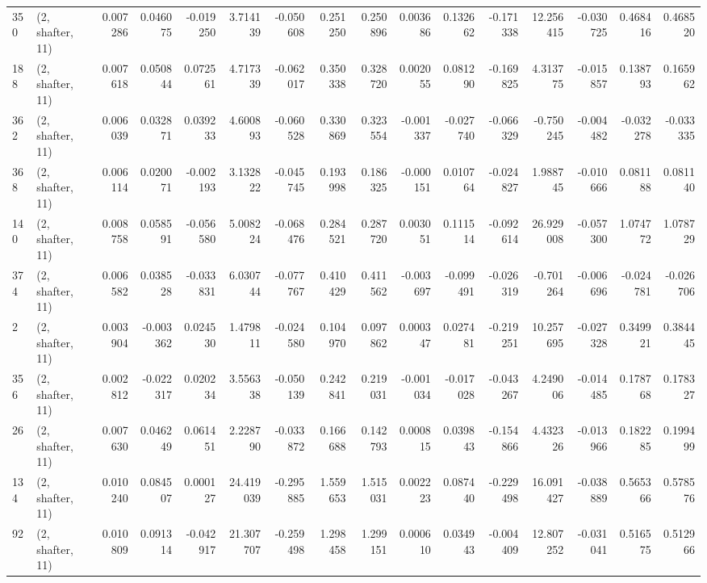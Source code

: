 \begin{tabular}{llrrrrrrrrrrrrrr}
350 &  (2, shafter, 11) &   0.007286 &  0.046075 & -0.019250 &    3.714139 & -0.050608 &   0.251250 &  0.250896 &  0.003686 &  0.132662 & -0.171338 &    12.256415 & -0.030725 &  0.468416 &  0.468520 \\
188 &  (2, shafter, 11) &   0.007618 &  0.050844 &  0.072561 &    4.717339 & -0.062017 &   0.350338 &  0.328720 &  0.002055 &  0.081290 & -0.169825 &     4.313775 & -0.015857 &  0.138793 &  0.165962 \\
362 &  (2, shafter, 11) &   0.006039 &  0.032871 &  0.039233 &    4.600893 & -0.060528 &   0.330869 &  0.323554 & -0.001337 & -0.027740 & -0.066329 &    -0.750245 & -0.004482 & -0.032278 & -0.033335 \\
368 &  (2, shafter, 11) &   0.006114 &  0.020071 & -0.002193 &    3.132822 & -0.045745 &   0.193998 &  0.186325 & -0.000151 &  0.010764 & -0.024827 &     1.988745 & -0.010666 &  0.081188 &  0.081140 \\
140 &  (2, shafter, 11) &   0.008758 &  0.058591 & -0.056580 &    5.008224 & -0.068476 &   0.284521 &  0.287720 &  0.003051 &  0.111514 & -0.092614 &    26.929008 & -0.057300 &  1.074772 &  1.078729 \\
374 &  (2, shafter, 11) &   0.006582 &  0.038528 & -0.033831 &    6.030744 & -0.077767 &   0.410429 &  0.411562 & -0.003697 & -0.099491 & -0.026319 &    -0.701264 & -0.006696 & -0.024781 & -0.026706 \\
2   &  (2, shafter, 11) &   0.003904 & -0.003362 &  0.024530 &    1.479811 & -0.024580 &   0.104970 &  0.097862 &  0.000347 &  0.027481 & -0.219251 &    10.257695 & -0.027328 &  0.349921 &  0.384445 \\
356 &  (2, shafter, 11) &   0.002812 & -0.022317 &  0.020234 &    3.556338 & -0.050139 &   0.242841 &  0.219031 & -0.001034 & -0.017028 & -0.043267 &     4.249006 & -0.014485 &  0.178768 &  0.178327 \\
26  &  (2, shafter, 11) &   0.007630 &  0.046249 &  0.061451 &    2.228790 & -0.033872 &   0.166688 &  0.142793 &  0.000815 &  0.039843 & -0.154866 &     4.432326 & -0.013966 &  0.182285 &  0.199499 \\
134 &  (2, shafter, 11) &   0.010240 &  0.084507 &  0.000127 &   24.419039 & -0.295885 &   1.559653 &  1.515031 &  0.002223 &  0.087440 & -0.229498 &    16.091427 & -0.038889 &  0.565366 &  0.578576 \\
92  &  (2, shafter, 11) &   0.010809 &  0.091314 & -0.042917 &   21.307707 & -0.259498 &   1.298458 &  1.299151 &  0.000610 &  0.034943 & -0.004409 &    12.807252 & -0.031041 &  0.516575 &  0.512966 \\

\end{tabular}
